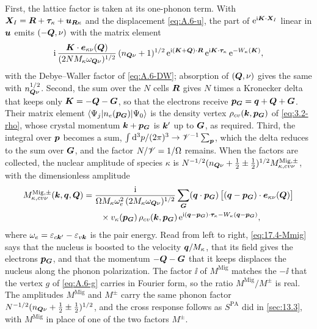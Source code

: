 First, the lattice factor is taken at its one-phonon term. With $\bm{X}_I = \bm{R} + \boldsymbol{\tau}_\kappa + \bm{u}_{\bm{R}\kappa}$ and the displacement \cref{eq:A.6-u}, the part of $\mathrm{e}^{\mathrm{i}\bm{K}\cdot\bm{X}_I}$ linear in $\bm{u}$ emits $(-\bm{Q},\nu)$ with the matrix element
\begin{equation*}
  \mathrm{i}\,\frac{\bm{K}\cdot\bm{e}_{\kappa\nu}(\bm{Q})}{(2NM_\kappa\omega_{\bm{Q}\nu})^{1/2}}\,(n_{\bm{Q}\nu} + 1)^{1/2}\,\mathrm{e}^{\mathrm{i}(\bm{K}+\bm{Q})\cdot\bm{R}}\,\mathrm{e}^{\mathrm{i}\bm{K}\cdot\boldsymbol{\tau}_\kappa}\,\mathrm{e}^{-W_\kappa(\bm{K})} ,
\end{equation*}
with the Debye--Waller factor of \cref{eq:A.6-DW}; absorption of $(\bm{Q},\nu)$ gives the same with $n_{\bm{Q}\nu}^{1/2}$. Second, the sum over the $N$ cells $\bm{R}$ gives $N$ times a Kronecker delta that keeps only $\bm{K} = -\bm{Q} - \bm{G}$, so that the electrons receive $\bm{p}_{\bm{G}} = \bm{q} + \bm{Q} + \bm{G}$. Their matrix element $\langle\Psi_j|n_e(\bm{p}_{\bm{G}})|\Psi_0\rangle$ is the density vertex $\rho_{cv}(\bm{k},\bm{p}_{\bm{G}})$ of \cref{eq:3.2-rho}, whose crystal momentum $\bm{k} + \bm{p}_{\bm{G}}$ is $\bm{k}'$ up to $\bm{G}$, as required. Third, the integral over $\bm{p}$ becomes a sum, $\int\mathrm{d}^3p/(2\pi)^3 \to \mathscr{V}^{-1}\sum_{\bm{p}}$, which the delta reduces to the sum over $\bm{G}$, and the factor $N/\mathscr{V} = 1/\Omega$ remains. When the factors are collected, the nuclear amplitude of species $\kappa$ is $N^{-1/2}(n_{\bm{Q}\nu} + \frac12 \pm \frac12)^{1/2}M^{\mathrm{Mig},\pm}_{\kappa,cv\nu}$, with the dimensionless amplitude
\begin{equation}
  \begin{split}
  M^{\mathrm{Mig},\pm}_{\kappa,cv\nu}(\bm{k},\bm{q},\bm{Q}) &= \frac{\mathrm{i}}{\Omega M_\kappa\omega_e^2\,(2M_\kappa\omega_{\bm{Q}\nu})^{1/2}}
  \sum_{\bm{G}}(\bm{q}\cdot\bm{p}_{\bm{G}})\,\bigl[(\bm{q} - \bm{p}_{\bm{G}})\cdot\bm{e}_{\kappa\nu}(\bm{Q})\bigr]\\
  &\qquad\times v_\kappa(\bm{p}_{\bm{G}})\,\rho_{cv}(\bm{k},\bm{p}_{\bm{G}})\,\mathrm{e}^{\mathrm{i}(\bm{q}-\bm{p}_{\bm{G}})\cdot\boldsymbol{\tau}_\kappa - W_\kappa(\bm{q}-\bm{p}_{\bm{G}})} ,
  \end{split}
  \label{eq:17.4-Mmig}
\end{equation}
where $\omega_e = \varepsilon_{c\bm{k}'} - \varepsilon_{v\bm{k}}$ is the pair energy. Read from left to right, \cref{eq:17.4-Mmig} says that the nucleus is boosted to the velocity $\bm{q}/M_\kappa$, that its field gives the electrons $\bm{p}_{\bm{G}}$, and that the momentum $-\bm{Q} - \bm{G}$ that it keeps displaces the nucleus along the phonon polarization. The factor $\ii$ of $M^{\mathrm{Mig}}$ matches the $-\ii$ that the vertex $g$ of \cref{eq:A.6-g} carries in Fourier form, so the ratio $M^{\mathrm{Mig}}/M^\pm$ is real. The amplitudes $M^{\mathrm{Mig}}$ and $M^\pm$ carry the same phonon factor $N^{-1/2}(n_{\bm{Q}\nu} + \frac12 \pm \frac12)^{1/2}$, and the cross response follows as $S^{\mathrm{PA}}$ did in \cref{sec:13.3}, with $M^{\mathrm{Mig}}$ in place of one of the two factors $M^\pm$.
